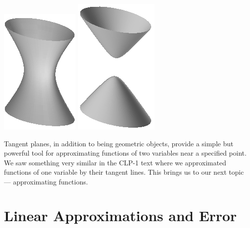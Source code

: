 \begin{eg}
\begin{efig}
\begin{center}
   \includegraphics[scale=1.0]{hyperboloid1sheetDD.pdf}\qquad\qquad
   \includegraphics[scale=1.0]{hyperboloid2sheetDD.pdf}
\end{center}
\end{efig}

\end{eg}

Tangent planes, in addition to being geometric objects, provide a 
simple but powerful tool for approximating functions of two variables
near a specified point. We saw something very similar in the CLP-1 text 
where we approximated functions of one variable by their tangent lines. 
This brings us to our next topic --- approximating functions.
 

\section{Linear Approximations and Error}\label{sec lin approx}


